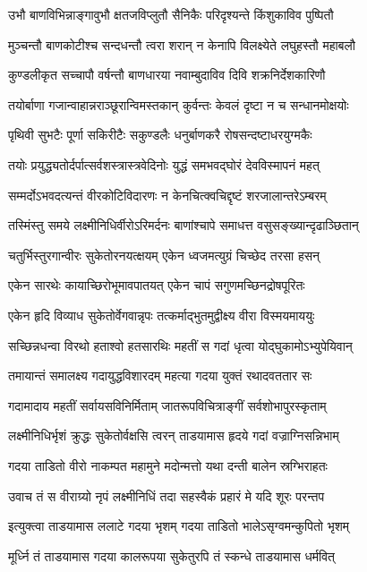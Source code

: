 \twolineshloka
{उभौ बाणविभिन्नाङ्गावुभौ क्षतजविप्लुतौ}
{सैनिकैः परिदृश्यन्ते किंशुकाविव पुष्पितौ}%

\twolineshloka
{मुञ्चन्तौ बाणकोटीश्च सन्दधन्तौ त्वरा शरान्}
{न केनापि विलक्ष्येते लघुहस्तौ महाबलौ}%

\twolineshloka
{कुण्डलीकृत सच्चापौ वर्षन्तौ बाणधारया}
{नवाम्बुदाविव दिवि शक्रनिर्देशकारिणौ}%

\twolineshloka
{तयोर्बाणा गजान्वाहान्नराञ्छूरान्विमस्तकान्}
{कुर्वन्तः केवलं दृष्टा न च सन्धानमोक्षयोः}%

\twolineshloka
{पृथिवी सुभटैः पूर्णा सकिरीटैः सकुण्डलैः}
{धनुर्बाणकरै रोषसन्दष्टाधरयुग्मकैः}%

\twolineshloka
{तयोः प्रयुद्ध्यतोर्दर्पात्सर्वशस्त्रास्त्रवेदिनोः}
{युद्धं समभवद्घोरं देवविस्मापनं महत्}%

\twolineshloka
{सम्मर्दोऽभवदत्यन्तं वीरकोटिविदारणः}
{न केनचित्क्वचिद्दृष्टं शरजालान्तरेऽम्बरम्}%

\twolineshloka
{तस्मिंस्तु समये लक्ष्मीनिधिर्वीरोऽरिमर्दनः}
{बाणांश्चापे समाधत्त वसुसङ्ख्यान्दृढाञ्छितान्}%

\twolineshloka
{चतुर्भिस्तुरगान्वीरः सुकेतोरनयत्क्षयम्}
{एकेन ध्वजमत्युग्रं चिच्छेद तरसा हसन्}%

\twolineshloka
{एकेन सारथेः कायाच्छिरोभूमावपातयत्}
{एकेन चापं सगुणमच्छिनद्रोषपूरितः}%

\twolineshloka
{एकेन हृदि विव्याध सुकेतोर्वेगवान्नृपः}
{तत्कर्माद्भुतमुद्वीक्ष्य वीरा विस्मयमाययुः}%

\twolineshloka
{सच्छिन्नधन्वा विरथो हताश्वो हतसारथिः}
{महतीं स गदां धृत्वा योद्घुकामोऽभ्युपेयिवान्}%

\twolineshloka
{तमायान्तं समालक्ष्य गदायुद्धविशारदम्}
{महत्या गदया युक्तं रथादवततार सः}%

\twolineshloka
{गदामादाय महतीं सर्वायसविनिर्मिताम्}
{जातरूपविचित्राङ्गीं सर्वशोभापुरस्कृताम्}%

\twolineshloka
{लक्ष्मीनिधिर्भृशं क्रुद्धः सुकेतोर्वक्षसि त्वरन्}
{ताडयामास हृदये गदां वज्राग्निसन्निभाम्}%

\twolineshloka
{गदया ताडितो वीरो नाकम्पत महामुने}
{मदोन्मत्तो यथा दन्ती बालेन स्रग्भिराहतः}%

\twolineshloka
{उवाच तं स वीराग्र्यो नृपं लक्ष्मीनिधिं तदा}
{सहस्वैकं प्रहारं मे यदि शूरः परन्तप}%

\twolineshloka
{इत्युक्त्वा ताडयामास ललाटे गदया भृशम्}
{गदया ताडितो भालेऽसृग्वमन्कुपितो भृशम्}%

\twolineshloka
{मूर्ध्नि तं ताडयामास गदया कालरूपया}
{सुकेतुरपि तं स्कन्धे ताडयामास धर्मवित्}%

